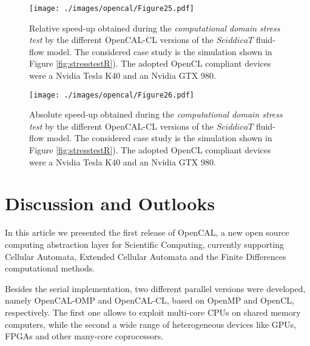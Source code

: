 \begin{figure}
	\begin{center}
		\texttt{[image: ./images/opencal/Figure25.pdf]}
		\caption{Relative speed-up obtained during the \emph{computational domain
				stress test} by the different OpenCAL-CL versions of the $SciddicaT$
			fluid-flow model. The considered case study is the simulation shown in
			Figure \ref{fig:stresstestR}). The adopted OpenCL compliant devices
			were a Nvidia Tesla K40 and an Nvidia GTX 980.}
		\label{gr:sciddicaT-CL-relative-speed-up-stressR}
	\end{center}
\end{figure}

\begin{figure}
	\begin{center}
		\texttt{[image: ./images/opencal/Figure26.pdf]}
		\caption{Absolute speed-up obtained during the \emph{computational domain
				stress test} by the different OpenCAL-CL versions of the $SciddicaT$
			fluid-flow model. The considered case study is the simulation shown in
			Figure \ref{fig:stresstestR}). The adopted OpenCL compliant devices
			were a Nvidia Tesla K40 and an Nvidia GTX 980.}
		\label{gr:sciddicaT-CL-absolute-speed-up-stressR}
	\end{center}
\end{figure}

\section{Discussion and Outlooks}

In this article we presented the first release of OpenCAL, a new
open source computing abstraction layer for Scientific Computing,
currently supporting Cellular Automata, Extended Cellular Automata
and the Finite Differences computational methods.

Besides the serial implementation, two different parallel versions
were developed, namely OpenCAL-OMP and OpenCAL-CL, based on OpenMP
and OpenCL, respectively. The first one allows to exploit multi-core
CPUs on shared memory computers, while the second a wide range of
heterogeneous devices like GPUs, FPGAs and other many-core
coprocessors.

